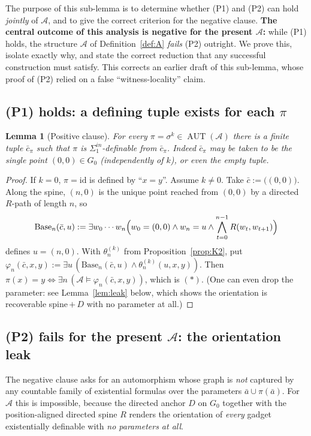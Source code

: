 \documentclass[12pt,fullpage]{article}
\newtheorem{lemma}[theorem]{Lemma}
\theoremstyle{definition}
\newcommand{\A}{\mathcal{A}}
\newcommand{\AUT}{\operatorname{AUT}}
\renewcommand{\phi}{\varphi}
\begin{document}
The purpose of this sub-lemma is to determine whether (P1) and (P2) can hold
\emph{jointly} of $\A$, and to give the correct criterion for the negative
clause.  \textbf{The central outcome of this analysis is negative for the
present $\A$:} while (P1) holds, the structure $\A$ of Definition~\ref{def:A}
\emph{fails} (P2) outright.  We prove this, isolate exactly why, and state the
correct reduction that any successful construction must satisfy.  This corrects
an earlier draft of this sub-lemma, whose proof of (P2) relied on a false
``witness-locality'' claim.

\subsection*{(P1) holds: a defining tuple exists for each $\pi$}

\begin{lemma}[Positive clause]\label{lem:P1}
For every $\pi=\sigma^k\in\AUT(\A)$ there is a finite tuple $\bar c_\pi$ such
that $\pi$ is $\Sigma^{in}_1$-definable from $\bar c_\pi$.  Indeed
$\bar c_\pi$ may be taken to be the single point $(0,0)\in G_0$ (independently
of $k$), or even the empty tuple.
\end{lemma}

\begin{proof}
If $k=0$, $\pi=\mathrm{id}$ is defined by ``$x=y$''.  Assume $k\neq0$.
Take $\bar c:=\bigl((0,0)\bigr)$.  Along the spine, $(n,0)$ is the unique
point reached from $(0,0)$ by a directed $R$-path of length $n$, so
\[
\mathrm{Base}_n(\bar c,u):=\exists w_0\cdots w_n\Bigl(w_0=(0,0)\wedge w_n=u\wedge\bigwedge_{t=0}^{n-1}R(w_t,w_{t+1})\Bigr)
\]
defines $u=(n,0)$.  With $\theta_n^{(k)}$ from Proposition~\ref{prop:K2}, put
$\phi_n(\bar c,x,y):=\exists u\,(\mathrm{Base}_n(\bar c,u)\wedge\theta_n^{(k)}(u,x,y))$.
Then $\pi(x)=y\iff\exists n\,(\A\models\phi_n(\bar c,x,y))$, which is $(\ast)$.
(One can even drop the parameter: see Lemma~\ref{lem:leak} below, which shows
the orientation is recoverable spine\,$+$\,$D$ with no parameter at all.)
\end{proof}

\subsection*{(P2) fails for the present $\A$: the orientation leak}

The negative clause asks for an automorphism whose graph is \emph{not}
captured by any countable family of existential formulas over the parameters
$\bar a\cup\pi(\bar a)$.  For $\A$ this is impossible, because the directed
anchor $D$ on $G_0$ together with the position-aligned directed spine $R$
renders the orientation of \emph{every} gadget existentially definable with
\emph{no parameters at all}.
\end{document}
